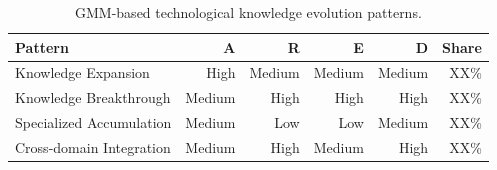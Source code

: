
\begin{table}[t]
\centering
\caption{GMM-based technological knowledge evolution patterns.}
\begin{tabular}{lrrrrr}
\toprule
Pattern & A & R & E & D & Share\\
\midrule
Knowledge Expansion & High & Medium & Medium & Medium & XX\%\\
Knowledge Breakthrough & Medium & High & High & High & XX\%\\
Specialized Accumulation & Medium & Low & Low & Medium & XX\%\\
Cross-domain Integration & Medium & High & Medium & High & XX\%\\
\bottomrule
\end{tabular}
\label{tab:gmm}
\end{table}
